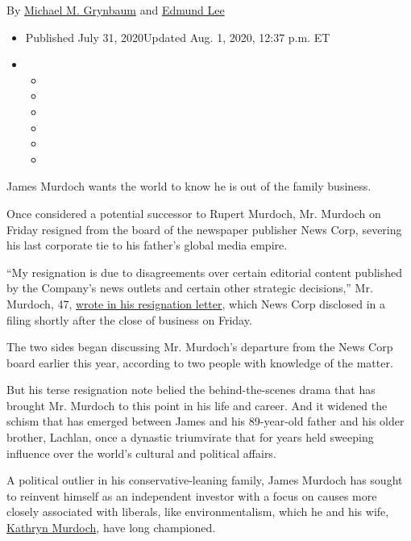 By \href{https://www.nytimes.com/by/michael-m-grynbaum}{Michael M.
Grynbaum} and \href{https://www.nytimes.com/by/edmund-lee}{Edmund Lee}

\begin{itemize}
\item
  Published July 31, 2020Updated Aug. 1, 2020, 12:37 p.m. ET
\item
  \begin{itemize}
  \item
  \item
  \item
  \item
  \item
  \item
  \end{itemize}
\end{itemize}

James Murdoch wants the world to know he is out of the family business.

Once considered a potential successor to Rupert Murdoch, Mr. Murdoch on
Friday resigned from the board of the newspaper publisher News Corp,
severing his last corporate tie to his father's global media empire.

``My resignation is due to disagreements over certain editorial content
published by the Company's news outlets and certain other strategic
decisions,'' Mr. Murdoch, 47,
\href{https://int.nyt.com/data/documenttools/james-murdoch-s-resignation-letter/5d16f07153370f9d/full.pdf}{wrote
in his resignation letter}, which News Corp disclosed in a filing
shortly after the close of business on Friday.

The two sides began discussing Mr. Murdoch's departure from the News
Corp board earlier this year, according to two people with knowledge of
the matter.

But his terse resignation note belied the behind-the-scenes drama that
has brought Mr. Murdoch to this point in his life and career. And it
widened the schism that has emerged between James and his 89-year-old
father and his older brother, Lachlan, once a dynastic triumvirate that
for years held sweeping influence over the world's cultural and
political affairs.

A political outlier in his conservative-leaning family, James Murdoch
has sought to reinvent himself as an independent investor with a focus
on causes more closely associated with liberals, like environmentalism,
which he and his wife,
\href{https://www.nytimes.com/2019/09/26/climate/kathryn-murdoch-climate-change-voting.html}{Kathryn
Murdoch}, have long championed.

